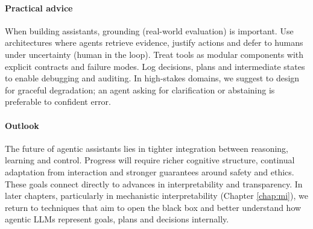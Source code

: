\paragraph{Practical advice}
When building assistants, grounding (real-world evaluation) is important. Use architectures where agents retrieve evidence, justify actions and defer to humans under uncertainty (human in the loop). Treat tools as modular components with explicit contracts and failure modes. Log decisions, plans and intermediate states to enable debugging and auditing. In high-stakes domains, we suggest to design for graceful degradation; an agent asking for clarification or abstaining is  preferable to confident error.

\paragraph{Outlook}
The future of agentic assistants lies in tighter integration between reasoning, learning and control. Progress will require richer cognitive structure, continual adaptation from interaction and stronger guarantees around safety and ethics. These goals connect directly to advances in interpretability and transparency. In later chapters, particularly in mechanistic interpretability (Chapter \ref{chap:mi}), we return to techniques that aim to open the black box and better understand how agentic LLMs represent goals, plans and decisions internally.








